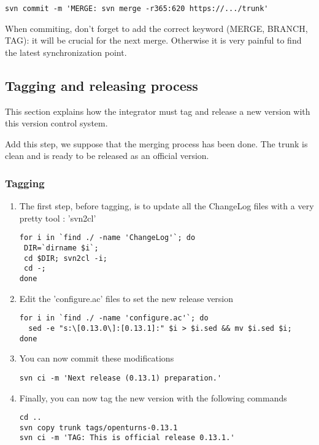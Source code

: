 \documentclass[11pt]{article}
\begin{document}
\begin{enumerate}
\begin{verbatim}
svn commit -m 'MERGE: svn merge -r365:620 https://.../trunk'
\end{verbatim}

  When commiting, don't forget to add the correct keyword (MERGE, BRANCH, TAG): it will be crucial for the next merge. Otherwise it is very painful to find the latest synchronization point.

\end{enumerate}

\subsection{Tagging and releasing process }

This section explains how the integrator must tag and release a new version with this version control system.

Add this step, we suppose that the merging process has been done. The trunk is clean and is ready to be released as an official version.

\subsubsection{Tagging}
\begin{enumerate}
\item The first step, before tagging, is to update all the ChangeLog files with a very pretty tool : 'svn2cl'
\begin{verbatim}
for i in `find ./ -name 'ChangeLog'`; do
 DIR=`dirname $i`;
 cd $DIR; svn2cl -i;
 cd -;
done
\end{verbatim}

\item Edit the 'configure.ac' files to set the new release version
\begin{verbatim}
for i in `find ./ -name 'configure.ac'`; do
  sed -e "s:\[0.13.0\]:[0.13.1]:" $i > $i.sed && mv $i.sed $i;
done
\end{verbatim}

\item You can now commit these modifications
\begin{verbatim}
svn ci -m 'Next release (0.13.1) preparation.'
\end{verbatim}

\item Finally, you can now tag the new version with the following commands
\begin{verbatim}
cd ..
svn copy trunk tags/openturns-0.13.1
svn ci -m 'TAG: This is official release 0.13.1.'
\end{verbatim}

\end{enumerate}
\end{document}
